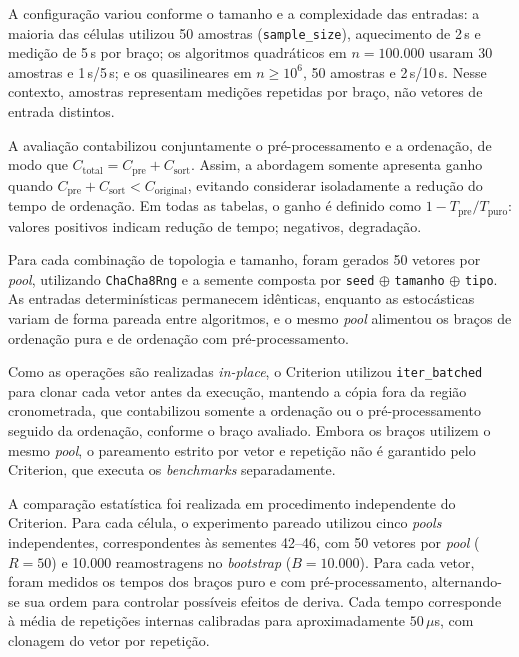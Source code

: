 \documentclass[12pt]{article}
\begin{document}
A configuração variou conforme o tamanho e a complexidade das entradas: a maioria das células utilizou 50 amostras (\texttt{sample\_size}), aquecimento de 2\,s e medição de 5\,s por braço; os algoritmos quadráticos em $n=100.000$ usaram 30 amostras e 1\,s/5\,s; e os quasilineares em $n\geq10^6$, 50 amostras e 2\,s/10\,s. Nesse contexto, amostras representam medições repetidas por braço, não vetores de entrada distintos.

A avaliação contabilizou conjuntamente o pré-processamento e a ordenação, de modo que $C_{\text{total}}=C_{\text{pre}}+C_{\text{sort}}$. Assim, a abordagem somente apresenta ganho quando $C_{\text{pre}}+C_{\text{sort}}<C_{\text{original}}$, evitando considerar isoladamente a redução do tempo de ordenação. Em todas as tabelas, o ganho é definido como $1-T_{\text{pre}}/T_{\text{puro}}$: valores positivos indicam redução de tempo; negativos, degradação.

Para cada combinação de topologia e tamanho, foram gerados 50 vetores por \emph{pool}, utilizando \texttt{ChaCha8Rng} e a semente composta por \texttt{seed} $\oplus$ \texttt{tamanho} $\oplus$ \texttt{tipo}. As entradas determinísticas permanecem idênticas, enquanto as estocásticas variam de forma pareada entre algoritmos, e o mesmo \emph{pool} alimentou os braços de ordenação pura e de ordenação com pré-processamento.

Como as operações são realizadas \emph{in-place}, o Criterion utilizou \texttt{iter\_batched} para clonar cada vetor antes da execução, mantendo a cópia fora da região cronometrada, que contabilizou somente a ordenação ou o pré-processamento seguido da ordenação, conforme o braço avaliado. Embora os braços utilizem o mesmo \emph{pool}, o pareamento estrito por vetor e repetição não é garantido pelo Criterion, que executa os \emph{benchmarks} separadamente.

A comparação estatística foi realizada em procedimento independente do Criterion. Para cada célula, o experimento pareado utilizou cinco \emph{pools} independentes, correspondentes às sementes 42--46, com 50 vetores por \emph{pool} ($R=50$) e 10.000 reamostragens no \emph{bootstrap} ($B=10.000$). Para cada vetor, foram medidos os tempos dos braços puro e com pré-processamento, alternando-se sua ordem para controlar possíveis efeitos de deriva. Cada tempo corresponde à média de repetições internas calibradas para aproximadamente $50\,\mu$s, com clonagem do vetor por repetição.
\end{document}
